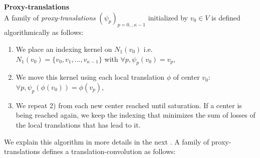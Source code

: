 \begin{definition}\textbf{Proxy-translations}\\
A family of \emph{proxy-translations} $(\psi_p)_{p=0,..\kappa-1}$ initialized by $v_0 \in V$ is defined algorithmically as follows:
\begin{enumerate}
\item We place an indexing kernel on $N_1(v_0) $ i.e.\\ $N_1(v_0) = \{v_0, v_1, ..., v_{\kappa-1}\}$ with $\forall p, \psi_p(v_0) = v_p$,
\item We move this kernel using each local translation $\phi$ of center $v_0$:\\ $\forall p, \psi_p(\phi(v_0)) = \phi(v_p)$,
\item We repeat 2) from each new center reached until saturation. If a center is being reached again, we keep the indexing that minimizes the sum of losses of the local translations that has lead to it.
\end{enumerate}
\end{definition}

We explain this algorithm in more details in the next . A family of proxy-translations defines a translation-convolution as follows:





